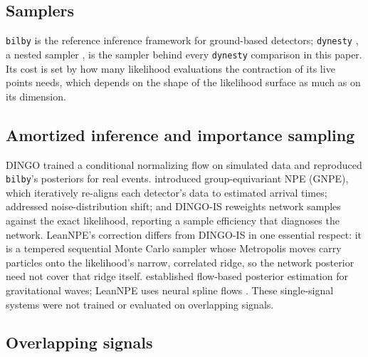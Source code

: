 \documentclass[twocolumn,linenumbers]{aastex701}
\begin{document}
\subsection{Samplers}

\texttt{bilby} \citep{Ashton2019Bilby, Romero2020Bilby2} is the reference
inference framework for ground-based detectors; \texttt{dynesty}
\citep{Speagle2020Dynesty}, a nested sampler \citep{Skilling2004}, is the
sampler behind every \texttt{dynesty} comparison in this paper. Its cost is
set by how many likelihood evaluations the contraction of its live points
needs, which depends on the shape of the likelihood surface as much as on its
dimension.

\subsection{Amortized inference and importance sampling}

DINGO \citep{Dax2021Dingo} trained a conditional normalizing flow on simulated
data and reproduced \texttt{bilby}'s posteriors for real events.
\citet{Dax2021Gnpe} introduced group-equivariant NPE (GNPE), which iteratively
re-aligns each detector's data to estimated arrival times;
\citet{Wildberger2023Dingo} addressed noise-distribution shift; and DINGO-IS
\citep{Dax2023DingoBns} reweights network samples against the exact likelihood,
reporting a sample efficiency that diagnoses the network. LeanNPE's
correction differs from DINGO-IS in one essential respect: it is a tempered
sequential Monte Carlo sampler \citep{DelMoral2006Smc} whose Metropolis moves
carry particles onto the likelihood's narrow, correlated ridge, so the network
posterior need not cover that ridge itself. \citet{Green2020FlowPE}
established flow-based posterior estimation for gravitational waves; LeanNPE
uses neural spline flows \citep{Durkan2019Nsf, Papamakarios2021Flows}. These
single-signal systems were not trained or evaluated on overlapping signals.

\subsection{Overlapping signals}
\end{document}
